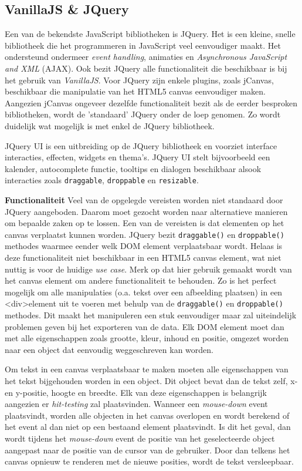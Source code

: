 \subsection{VanillaJS \& JQuery}
Een van de bekendste JavaScript bibliotheken is JQuery. Het is een kleine, snelle bibliotheek die het programmeren in JavaScript veel eenvoudiger maakt. Het ondersteund ondermeer \textit{event handling}, animaties en \textit{Asynchronous JavaScript and XML} (AJAX). Ook bezit JQuery alle functionaliteit die beschikbaar is bij het gebruik van \textit{VanillaJS}. Voor JQuery zijn enkele plugins, zoals jCanvas, beschikbaar die manipulatie van het HTML5 canvas eenvoudiger maken. %
Aangezien jCanvas ongeveer dezelfde functionaliteit bezit als de eerder besproken bibliotheken, wordt de 'standaard' JQuery onder de loep genomen. Zo wordt duidelijk wat mogelijk is met enkel de JQuery bibliotheek.

JQuery UI is een uitbreiding op de JQuery bibliotheek en voorziet interface interacties, effecten, widgets en thema's. JQuery UI stelt bijvoorbeeld een kalender, autocomplete functie, tooltips en dialogen beschikbaar alsook interacties zoals \texttt{draggable}, \texttt{droppable} en \texttt{resizable}. 

\textbf{Functionaliteit} \break
Veel van de opgelegde vereisten worden niet standaard door JQuery aangeboden. Daarom moet gezocht worden naar alternatieve manieren om bepaalde zaken op te lossen. Een van de vereisten is dat elementen op het canvas verplaatst kunnen worden. JQuery bezit \texttt{draggable()} en \texttt{droppable()} methodes waarmee eender welk DOM element verplaatsbaar wordt. Helaas is deze functionaliteit niet beschikbaar in een HTML5 canvas element, wat niet nuttig is voor de huidige \textit{use case}. Merk op dat hier gebruik gemaakt wordt van het canvas element om andere functionaliteit te behouden. Zo is het perfect mogelijk om alle manipulaties (o.a. tekst over een afbeelding plaatsen) in een \textless div\textgreater element uit te voeren met behulp van de \texttt{draggable()} en \texttt{droppable()} methodes. Dit maakt het manipuleren een stuk eenvoudiger maar zal uiteindelijk problemen geven bij het exporteren van de data. Elk DOM element moet dan met alle eigenschappen zoals grootte, kleur, inhoud en positie, omgezet worden naar een object dat eenvoudig weggeschreven kan worden. 

Om tekst in een canvas verplaatsbaar te maken moeten alle eigenschappen van het tekst bijgehouden worden in een object. Dit object bevat dan de tekst zelf, x-en y-positie, hoogte en breedte. Elk van deze eigenschappen is belangrijk aangezien er \textit{hit-testing} zal plaatsvinden. Wanneer een \textit{mouse-down} event plaatsvindt, worden alle objecten in het canvas overlopen en wordt berekend of het event al dan niet op een bestaand element plaatsvindt. Is dit het geval, dan wordt tijdens het \textit{mouse-down} event de positie van het geselecteerde object aangepast naar de positie van de cursor van de gebruiker. Door dan telkens het canvas opnieuw te renderen met de nieuwe posities, wordt de tekst versleepbaar.

